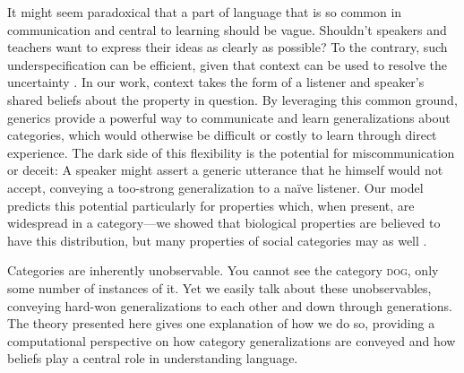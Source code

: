 \documentclass{pnastwo}
\begin{document}
\begin{article}
It might seem paradoxical that a part of language that is so common in communication and central to learning should be vague. 
Shouldn't speakers and teachers want to express their ideas as clearly as possible?
To the contrary, such underspecification can be efficient, given that context can be used to resolve the uncertainty \cite{Piantadosi2012}.
In our work, context takes the form of a listener and speaker's shared beliefs about the property in question. 
By leveraging this common ground, generics provide a powerful way to communicate and learn generalizations about categories, 
which would otherwise be difficult or costly to learn through direct experience.
The dark side of this flexibility is the potential for miscommunication or deceit: A speaker might assert a generic utterance that he himself would not accept, conveying a too-strong generalization to a na\"{i}ve listener.  
Our model predicts this potential particularly for properties which, when present, are widespread in a category---we showed that biological properties are believed to have this distribution, but many properties of social categories may as well \cite{Cimpian2011a,Cimpian2012b,Rhodes2012}.


Categories are inherently unobservable. 
You cannot see the category \textsc{dog}, only some number of instances of it.
Yet we easily talk about these unobservables, conveying hard-won generalizations to each other and down through generations.
The theory presented here gives one explanation of how we do so, providing a computational perspective on how category generalizations are conveyed and how beliefs play a central role in understanding language.







\begin{materials}

\end{materials}
\end{article}
\end{document}
